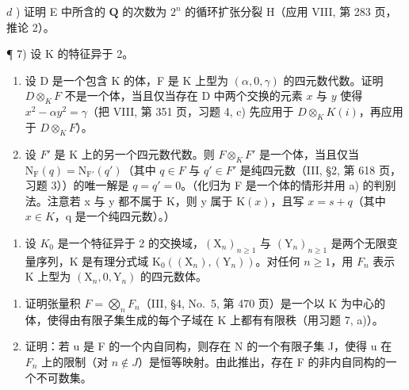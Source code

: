 \(d\) ) 证明 E 中所含的 \(\mathbf{Q}\) 的次数为 \(2^{n}\) 的循环扩张分裂 H（应用 VIII, 第 283 页，推论 2）。

¶ 7) 设 K 的特征异于 2。

\begin{enumerate}
\def\labelenumi{\alph{enumi})}
\item
  设 D 是一个包含 K 的体，F 是 K 上型为 \((\alpha, 0, \gamma)\) 的四元数代数。证明 \(D \otimes_{K} F\) 不是一个体，当且仅当存在 D 中两个交换的元素 \(x\) 与 \(y\) 使得 \(x^2 - \alpha y^2 = \gamma\)（把 VIII, 第 351 页，习题 4, c) 先应用于 \(D \otimes_{K} K(i)\)，再应用于 \(D \otimes_{K} F\)）。
\item
  设 \(F'\) 是 K 上的另一个四元数代数。则 \(F \otimes_{K} F'\) 是一个体，当且仅当 \(\mathrm{N}_{\mathrm{F}}(q) = \mathrm{N}_{\mathrm{F}'}(q')\)（其中 \(q \in F\) 与 \(q' \in F'\) 是纯四元数（III, §2, 第 618 页，习题 3））的唯一解是 \(q = q' = 0\)。（化归为 F 是一个体的情形并用 a) 的判别法。注意若 x 与 y 都不属于 K，则 y 属于 \(\mathrm{K}(x)\)，且写 \(x = s + q\)（其中 \(x \in K\)，q 是一个纯四元数）。）
\end{enumerate}

\begin{enumerate}
\def\labelenumi{\arabic{enumi})}
\setcounter{enumi}{7}
\tightlist
\item
  设 \(K_{0}\) 是一个特征异于 2 的交换域，\((\mathrm{X}_{n})_{n\geqslant1}\) 与 \((\mathrm{Y}_{n})_{n\geqslant1}\) 是两个无限变量序列，K 是有理分式域 \(\mathrm{K}_{0}((\mathrm{X}_{n}),(\mathrm{Y}_{n}))\)。对任何 \(n\geqslant1\)，用 \(F_{n}\) 表示 K 上型为 \((\mathrm{X}_{n},0,\mathrm{Y}_{n})\) 的四元数体。
\end{enumerate}

\begin{enumerate}
\def\labelenumi{\alph{enumi})}
\item
  证明张量积 \(F = \bigotimes_{n} F_{n}\)（III, §4, No.~5, 第 470 页）是一个以 K 为中心的体，使得由有限子集生成的每个子域在 K 上都有有限秩（用习题 7, a)）。
\item
  证明：若 u 是 F 的一个内自同构，则存在 N 的一个有限子集 J，使得 u 在 \(F_{n}\) 上的限制（对 \(n \notin J\)）是恒等映射。由此推出，存在 F 的非内自同构的一个不可数集。
\end{enumerate}

